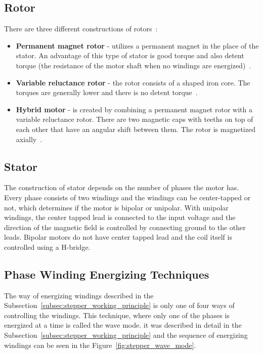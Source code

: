 \subsection{Rotor}
\label{subsec:rotor}
There are three different constructions of rotors~\cite{carmine_fiore_stepper_2021}:
\begin{itemize}
    \item \textbf{Permanent magnet rotor} - utilizes a permanent magnet in the place of the stator.
    An advantage of this type of stator is good torque and also detent torque (the resistance of the motor shaft when no windings are energized)~\cite{carmine_fiore_stepper_2021}.
    \item \textbf{Variable reluctance rotor} - the rotor consists of a shaped iron core.
    The torques are generally lower and there is no detent torque~\cite{carmine_fiore_stepper_2021}.
    \item \textbf{Hybrid motor} - is created by combining a permanent magnet rotor with a variable reluctance rotor.
    There are two magnetic caps with teeths on top of each other that have an angular shift between them.
    The rotor is magnetized axially~\cite{carmine_fiore_stepper_2021}.
\end{itemize}

\subsection{Stator}
\label{subsec:stator}
The construction of stator depends on the number of phases the motor has.
Every phase consists of two windings and the windings can be center-tapped or not, which determines if the motor is bipolar or unipolar.
With unipolar windings, the center tapped lead is connected to the input voltage and the direction of the magnetic field is controlled by connecting ground to the other leads.
Bipolar motors do not have center tapped lead and the coil itself is controlled using a H-bridge.

\subsection{Phase Winding Energizing Techniques}
\label{subsec:winding_tech}
The way of energizing windings described in the Subsection~\ref{subsec:stepper_working_principle} is only one of four ways of controlling the windings.
This technique, where only one of the phases is energized at a time is called the wave mode.
it was described in detail in the Subsection~\ref{subsec:stepper_working_principle} and the sequence of energizing windings can be seen in the Figure~\ref{fig:stepper_wave_mode}.

